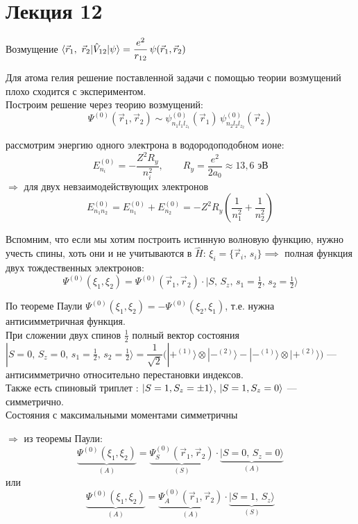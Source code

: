 \section{Лекция 12}

Возмущение \quad $\langle \vec{r}_1,~\vec{r}_2 | \hat{V}_{12} | \psi \rangle = \dfrac{e^2}{r_{12}}\,\psi(\vec{r}_1, \vec{r}_2)$

Для атома гелия решение поставленной задачи с помощью теории возмущений плохо сходится с экспериментом.\\

Построим решение через теорию возмущений:
\[
\Psi^{(0)}(\vec{r}_1, \vec{r}_2) \sim \psi^{(0)}_{n_1 l_1 l_{z_1}}(\vec{r}_1)\,\psi^{(0)}_{n_2 l_2 l_{z_2}}(\vec{r}_2)
\]

рассмотрим энергию одного электрона в водородоподобном ионе:
\[
E^{(0)}_{n_i} = -\frac{Z^2 R_y}{n_i^2}, \qquad R_y = \frac{e^2}{2a_0} \approx 13{,}6 \text{ эВ}
\]
$\Rightarrow$ для двух невзаимодействующих электронов
\[
E^{(0)}_{n_1 n_2} = E^{(0)}_{n_1} + E^{(0)}_{n_2} = -Z^2 R_y\left(\frac{1}{n_1^2} + \frac{1}{n_2^2}\right)
\]

Вспомним, что если мы хотим построить истинную волновую функцию, нужно учесть спины, хоть они и не учитываются в $\hat{H}$: $\xi_i = \{\vec{r}_i,\, s_i\} \implies$ полная функция двух тождественных электронов:
\[
\Psi^{(0)}(\xi_1, \xi_2) = \Psi^{(0)}(\vec{r}_1,\vec{r}_2)\cdot |S,\,S_z,\,s_1 = \tfrac{1}{2},\, s_2 = \tfrac{1}{2}\rangle
\]

По теореме Паули $\Psi^{(0)}(\xi_1, \xi_2) = -\Psi^{(0)}(\xi_2, \xi_1)$, т.е. нужна антисимметричная функция.\\

При сложении двух спинов $\tfrac{1}{2}$ полный вектор состояния $|S{=}0,\,S_z{=}0,\,s_1{=}\tfrac{1}{2},\,s_2{=}\tfrac{1}{2}\rangle = \dfrac{1}{\sqrt{2}}\Big(|{+}^{(1)}\rangle \otimes |{-}^{(2)}\rangle - |{-}^{(1)}\rangle \otimes |{+}^{(2)}\rangle\Big)$ ---
антисимметрично относительно перестановки индексов.\\

Также есть спиновый триплет : $| S=1, S_z = \pm 1 \rangle$, $| S=1, S_z = 0 \rangle$ --- симметрично.\\

Состояния с максимальными моментами симметричны

$\Rightarrow$ из теоремы Паули:
\[
\underbrace{\Psi^{(0)}(\xi_1,\xi_2)}_{(A)} = \underbrace{\Psi^{(0)}_S(\vec{r}_1,\vec{r}_2)}_{(S)} \cdot \underbrace{|S{=}0,\,S_z{=}0\rangle}_{(A)}
\]
или
\[
\underbrace{\Psi^{(0)}(\xi_1,\xi_2)}_{(A)} = \underbrace{\Psi^{(0)}_A(\vec{r}_1,\vec{r}_2)}_{(A)} \cdot \underbrace{|S{=}1,\,S_z\rangle}_{(S)}
\]

